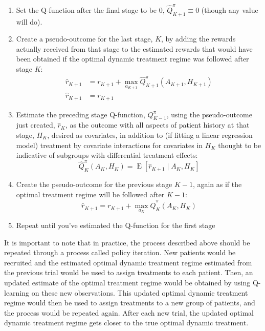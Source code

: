 \documentclass[12pt]{article}
\begin{document}
\begin{enumerate}
  \item Set the Q-function after the final stage to be 0, $\hat{Q}^{\pi}_{K+1} \equiv 0$ (though any value will do).
  \item Create a pseudo-outcome for the last stage, $K$, by adding the rewards actually received from that stage to the estimated rewards that would have been obtained if the optimal dynamic treatment regime was followed after stage $K$:
  \begin{align}
    \hat{r}_{K+1} &= r_{K+1} + \max_{a_{K+1}} \hat{Q}^{\pi}_{K+1}(A_{K+1}, H_{K+1}) \\
    \hat{r}_{K+1} &= r_{K+1}
  \end{align}
  \item Estimate the preceding stage Q-function, $Q^{\pi}_{K - 1}$, using the pseudo-outcome just created, $\hat{r}_{K}$, as the outcome with all aspects of patient history at that stage, $H_{K}$, desired as covariates, in addition to (if fitting a linear regression model) treatment by covariate interactions for covariates in $H_{K}$ thought to be indicative of subgroups with differential treatment effects:
  \begin{equation}
      \hat{Q}^{\pi}_{K}(A_{K}, H_{K}) = \operatorname{E}[\hat{r}_{K+1} \mid A_{K}, H_{K}]
  \end{equation}
  \item Create the pseudo-outcome for the previous stage $K - 1$, again as if the optimal treatment regime will be followed after $K - 1$:
  \begin{equation}
    \hat{r}_{K+1} = r_{K+1} + \max_{a_K} \hat{Q}^{\pi}_{K}(A_{K}, H_{K})
  \end{equation}
  \item Repeat until you've estimated the Q-function for the first stage
\end{enumerate}



It is important to note that in practice, the process described above should be repeated through a process called policy iteration. New patients would be recruited and the estimated optimal dynamic treatment regime estimated from the previous trial would be used to assign treatments to each patient. Then, an updated estimate of the optimal treatment regime would be obtained by using Q-learning on these new observations. This updated optimal dynamic treatment regime would then be used to assign treatments to a new group of patients, and the process would be repeated again. After each new trial, the updated optimal dynamic treatment regime gets closer to the true optimal dynamic treatment. 
\end{document}
